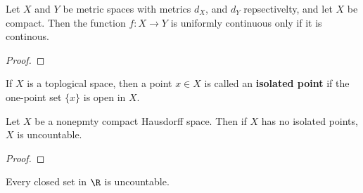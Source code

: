 \begin{theorem}\label{3.6.6}
    Let $X$ and  $Y$ be metric spaces with metrics $d_X$, and  $d_Y$
    repsectivelty, and let $X$ be compact. Then the function
    $f:X \rightarrow Y$ is uniformly continuous only if it is continous.
\end{theorem}
\begin{proof}
\end{proof}

\begin{definition}
    If $X$ is a toplogical space, then a point $x \in X$ is called an
    \textbf{isolated point} if the one-point set $\{x\}$ is open in $X$.
\end{definition}

\begin{theorem}\label{3.6.7}
    Let $X$ be a nonepmty compact Hausdorff space. Then if $X$ has no isolated
    points,  $X$ is uncountable.
\end{theorem}
\begin{proof}
\end{proof}
\begin{corollary}
    Every closed set in $\R$ is uncountable.
\end{corollary}
